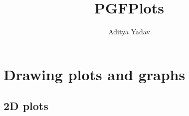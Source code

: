 \documentclass{article}
\title{PGFPlots}
\author{Aditya Yadav}
\begin{document}
\maketitle
\section{Drawing plots and graphs}
\subsection{2D plots}

\begin{tikzpicture}
	
\end{tikzpicture}
\end{document}
